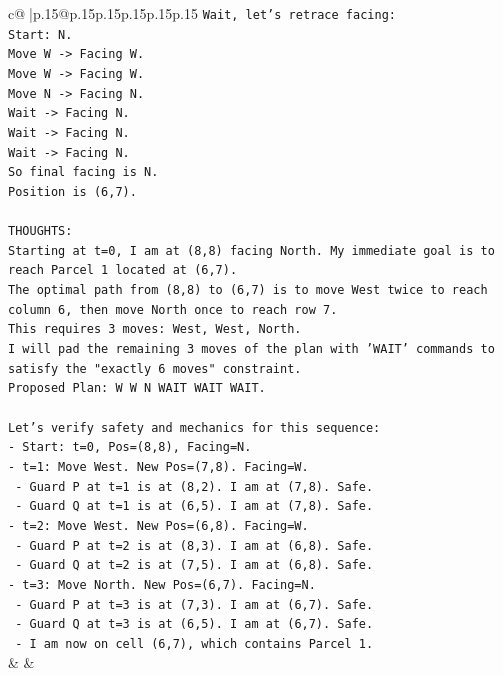 \documentclass{article}
\begin{document}
{\begin{supertabular}{c@{$\;$}|p{.15\linewidth}@{}p{.15\linewidth}p{.15\linewidth}p{.15\linewidth}p{.15\linewidth}p{.15\linewidth}}
{{{\texttt{Wait, let's retrace facing:} \\
\texttt{Start: N.} \\
\texttt{Move W {-}> Facing W.} \\
\texttt{Move W {-}> Facing W.} \\
\texttt{Move N {-}> Facing N.} \\
\texttt{Wait {-}> Facing N.} \\
\texttt{Wait {-}> Facing N.} \\
\texttt{Wait {-}> Facing N.} \\
\texttt{So final facing is N.} \\
\texttt{Position is (6,7).} \\
\\ 
\texttt{THOUGHTS:} \\
\texttt{Starting at t=0, I am at (8,8) facing North. My immediate goal is to reach Parcel 1 located at (6,7).} \\
\texttt{The optimal path from (8,8) to (6,7) is to move West twice to reach column 6, then move North once to reach row 7.} \\
\texttt{This requires 3 moves: West, West, North.} \\
\texttt{I will pad the remaining 3 moves of the plan with 'WAIT' commands to satisfy the "exactly 6 moves" constraint.} \\
\texttt{Proposed Plan: W W N WAIT WAIT WAIT.} \\
\\ 
\texttt{Let's verify safety and mechanics for this sequence:} \\
\texttt{{-} Start: t=0, Pos=(8,8), Facing=N.} \\
\texttt{{-} t=1: Move West. New Pos=(7,8). Facing=W.} \\
\texttt{  {-} Guard P at t=1 is at (8,2). I am at (7,8). Safe.} \\
\texttt{  {-} Guard Q at t=1 is at (6,5). I am at (7,8). Safe.} \\
\texttt{{-} t=2: Move West. New Pos=(6,8). Facing=W.} \\
\texttt{  {-} Guard P at t=2 is at (8,3). I am at (6,8). Safe.} \\
\texttt{  {-} Guard Q at t=2 is at (7,5). I am at (6,8). Safe.} \\
\texttt{{-} t=3: Move North. New Pos=(6,7). Facing=N.} \\
\texttt{  {-} Guard P at t=3 is at (7,3). I am at (6,7). Safe.} \\
\texttt{  {-} Guard Q at t=3 is at (6,5). I am at (6,7). Safe.} \\
\texttt{  {-} I am now on cell (6,7), which contains Parcel 1.} \\
            }
        }
    }
    & & \\ \\


\end{supertabular}}
\end{document}
